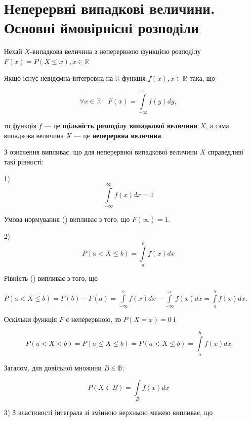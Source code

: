 \section{Неперервні випадкові величини. Основні ймовірнісні розподіли}

Нехай $X$-випадкова величина з неперервною функцією розподілу $F(x) = P(X \leqslant x), x \in \mathbb{R}$

Якщо існує невідємна інтегровна на $\mathbb{R}$ функція
$f(x), x \in \mathbb{R}$ така, що

\begin{equation}
    \forall x \in \mathbb{R} \quad F(x) = \int\limits_{-\infty}^{x} f(y) dy,
\end{equation}

то функція $f$ --- це \textbf{щільність розподілу випадкової величини $X$},
а сама випадкова величина $X$ --- це \textbf{неперервна величина}.

З означення випливає, що для неперервної випадкової величини $X$ справедливі такі рівності:

1) \begin{equation}
    \int\limits_{-\infty}^{\infty} f(x) dx = 1
\end{equation}

Умова нормування () випливає з того, що $F(\infty) = 1$.

2) \begin{equation}
    P(a < X \leqslant b) = \int\limits_{a}^{b} f(x) dx
\end{equation}

Рівність () випливає з того, що 

$P(a < X \leqslant b) = F(b) - F(a)
= \int\limits_{-\infty}^{b} f(x) dx - \int\limits_{-\infty}^{a} f(x) dx
= \int\limits_{a}^{b} f(x) dx.$

Оскільки функція $F$ є неперервною, то $P(X = x) = 0$ і

\begin{equation}
    P(a < X < b) = P(a \leqslant X \leqslant b)
    = P(a < X \leqslant b)
    = \int\limits_{a}^{b} f(x) dx
\end{equation}

Загалом, для довільної множини $B \in \mathbb{B}$:

\begin{equation}
    P(X \in B) = \int\limits_{B} f(x) dx
\end{equation}

3) З властивості інтеграла зі змінною верхньою межею випливає, що

